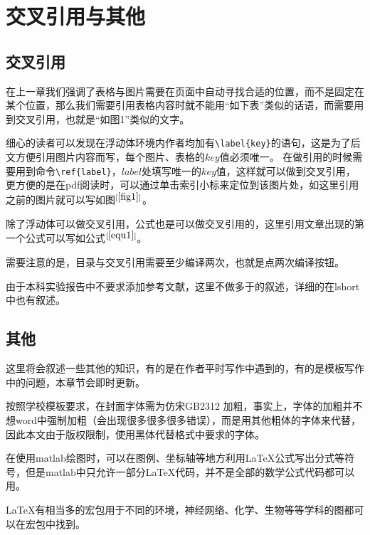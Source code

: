 \section{交叉引用与其他}
\subsection{交叉引用}
在上一章我们强调了表格与图片需要在页面中自动寻找合适的位置，而不是固定在某个位置，那么我们需要引用表格内容时就不能用“如下表”类似的话语，而需要用到交叉引用，也就是“如图1”类似的文字。

细心的读者可以发现在浮动体环境内作者均加有\verb|\label{key}|的语句，这是为了后文方便引用图片内容而写，每个图片、表格的$key$值必须唯一。
在做引用的时候需要用到命令\verb|\ref{label}|，$label$处填写唯一的$key$值，这样就可以做到交叉引用，更方便的是在pdf阅读时，可以通过单击索引小标来定位到该图片处，如这里引用之前的图片就可以写如图$^{[\ref{fig1}]}$。

除了浮动体可以做交叉引用，公式也是可以做交叉引用的，这里引用文章出现的第一个公式可以写如公式$^{[\ref{equ1}]}$。

需要注意的是，目录与交叉引用需要至少编译两次，也就是点两次编译按钮。

由于本科实验报告中不要求添加参考文献，这里不做多于的叙述，详细的在lshort中也有叙述。
\subsection{其他}
这里将会叙述一些其他的知识，有的是在作者平时写作中遇到的，有的是模板写作中的问题，本章节会即时更新。

按照学校模板要求，在封面字体需为仿宋GB2312 加粗，事实上，字体的加粗并不想word中强制加粗（会出现很多很多很多错误），而是用其他粗体的字体来代替，因此本文由于版权限制，使用黑体代替格式中要求的字体。

在使用matlab绘图时，可以在图例、坐标轴等地方利用\LaTeX 公式写出分式等符号，但是matlab中只允许一部分\LaTeX 代码，并不是全部的数学公式代码都可以用。

\LaTeX 有相当多的宏包用于不同的环境，神经网络、化学、生物等等学科的图都可以在宏包中找到。